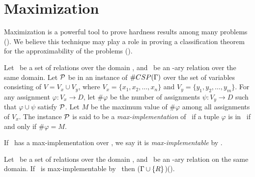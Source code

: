 \section{Maximization}
Maximization is a powerful tool to prove hardness results among many problems \ccsp(\mrelset)\@.
We believe this technique may play a role in proving a classification theorem for the approximability of the problems \ccsp(\mrelset)\@.

\begin{defi}\label{def:max}
Let \mrelset\ be a set of relations over the domain \mD,
and \mR\ be an \mn-ary relation over the same domain. 
Let \(\mathcal{P}\) be in an instance of \(\#CSP(\Gamma)\) over the
set of variables consisting of \(V=V_x \cup V_y\), where \(V_x = \{x_1,x_2,\dots,x_n\}\)
and \(V_y=\{y_1,y_2,\dotsc,y_m\}\)\@. For any assignment \(\varphi: V_x\to D\),
let \(\#\varphi\) be the number of assignments \(\psi:V_y\to D\) such
that \(\varphi \cup \psi\) satisfy \(\mathcal{P}\)\@. Let \(M\) be the maximum value of \(\#\varphi\)
among all assignments of \(V_x\)\@. The instance \(\mathcal{P}\) is said to be a \emph{max-implementation}
of \mR\ if a tuple \(\varphi\) is in \mR\ if and only if \(\#\varphi = M\)\@.
\end{defi} 

If \mR\ has a max-implementation over \mrelset, we say it is \emph{max-implementable} by \mrelset\@.

\begin{theorem}[Maximization]\label{theo:max}
Let \mrelset\ be a set of relations over the domain \mD,
and \mR\ be an \mn-ary relation on the same domain. 
If \mR\ is max-implementable by \mrelset\ then \ccsp(\(\Gamma \cup \{{R}\}\))\maple\ccsp(\mrelset)\@.
\end{theorem}

